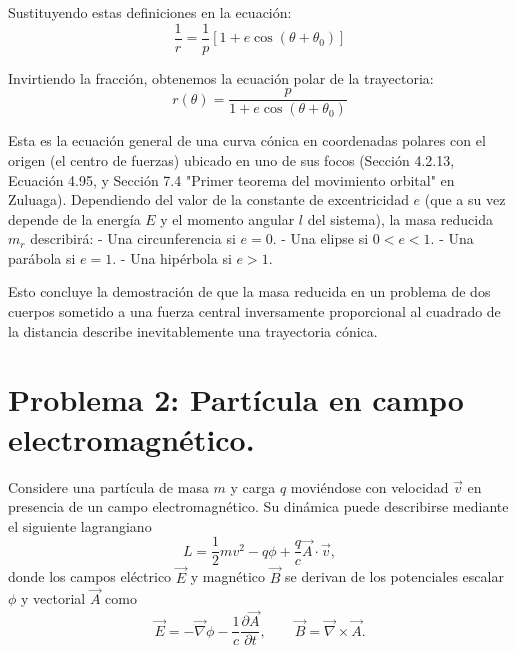 \documentclass[a4paper]{article}
\begin{document}
Sustituyendo estas definiciones en la ecuación:
$$\frac{1}{r} = \frac{1}{p} \left[ 1 + e \cos(\theta + \theta_0) \right]$$

Invirtiendo la fracción, obtenemos la ecuación polar de la trayectoria:
$$r(\theta) = \frac{p}{1 + e \cos(\theta + \theta_0)}$$

Esta es la ecuación general de una curva cónica en coordenadas polares con el origen (el centro de fuerzas) ubicado en uno de sus focos (Sección 4.2.13, Ecuación 4.95, y Sección 7.4 "Primer teorema del movimiento orbital" en Zuluaga). Dependiendo del valor de la constante de excentricidad $e$ (que a su vez depende de la energía $E$ y el momento angular $l$ del sistema), la masa reducida $m_r$ describirá:
- Una circunferencia si $e = 0$.
- Una elipse si $0 < e < 1$.
- Una parábola si $e = 1$.
- Una hipérbola si $e > 1$.

Esto concluye la demostración de que la masa reducida en un problema de dos cuerpos sometido a una fuerza central inversamente proporcional al cuadrado de la distancia describe inevitablemente una trayectoria cónica.

\section{Problema 2: Partícula en campo electromagnético.}

Considere una partícula de masa $m$ y carga $q$ moviéndose con velocidad $\vec{v}$ en presencia de un campo electromagnético. Su dinámica puede describirse mediante el siguiente lagrangiano
$$L = \frac{1}{2}mv^2 - q\phi + \frac{q}{c}\vec{A} \cdot \vec{v},$$
donde los campos eléctrico $\vec{E}$ y magnético $\vec{B}$ se derivan de los potenciales escalar $\phi$ y vectorial $\vec{A}$ como
$$\vec{E} = -\vec{\nabla}\phi - \frac{1}{c}\frac{\partial \vec{A}}{\partial t}, \qquad \vec{B} = \vec{\nabla} \times \vec{A}.$$
\end{document}
